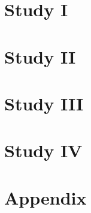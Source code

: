 \documentclass[
]{scrbook}
\begin{document}
\chapter{Study I}\label{studyI}

\begin{minipage}{\textwidth}

\end{minipage}



\chapter{Study II}\label{studyII}

\begin{minipage}{\textwidth}

\end{minipage}



\chapter{Study III}\label{studyIII}

\begin{minipage}{\textwidth}

\end{minipage}



\chapter{Study IV}\label{studyIV}

\begin{minipage}{\textwidth}

\end{minipage}



\chapter*{Appendix}\label{appendix}
\end{document}
